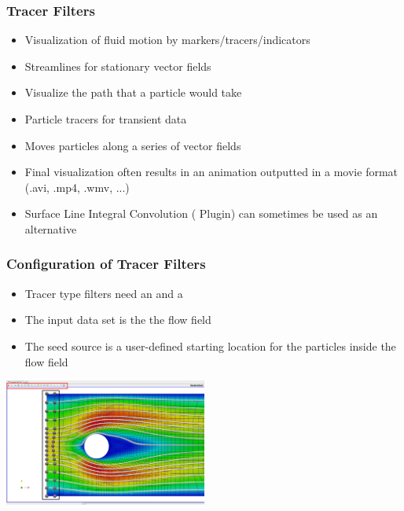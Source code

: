 \begin{frame}
  \frametitle{Tracer Filters}
    \begin{itemize}
      \item Visualization of fluid motion by markers/tracers/indicators
      \item Streamlines for stationary vector fields
      \item Visualize the path that a particle would take 
      \item Particle tracers for transient data
      \item Moves particles along a series of vector fields
      \item Final visualization often results in an animation outputted in a movie format (.avi, .mp4, .wmv, ...)
      \item Surface Line Integral Convolution ( Plugin) can sometimes be used as an alternative
    \end{itemize}
\end{frame}

\begin{frame}

  \frametitle{Configuration of Tracer Filters}

    \begin{itemize}
      \item Tracer type filters need an  and a 
      \item The input data set is the the flow field  
      \item The seed source is a user-defined starting location for the particles inside the flow field  
    \end{itemize}
		\begin{center}
    \includegraphics[width=0.5\textwidth]{screenshots/tracer-source.png}			
		\end{center}
\end{frame}

